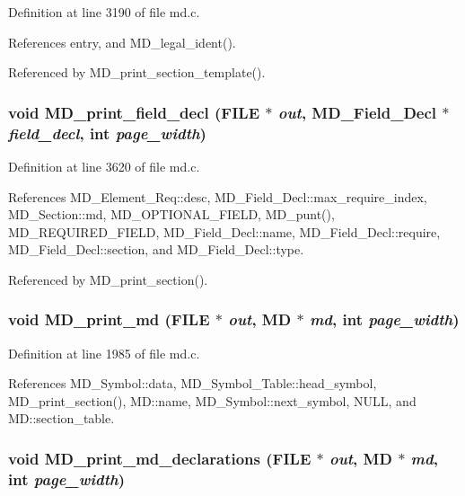 Definition at line 3190 of file md.c.

References entry, and MD\_\-legal\_\-ident().

Referenced by MD\_\-print\_\-section\_\-template().
\subsubsection{\setlength{\rightskip}{0pt plus 5cm}void MD\_\-print\_\-field\_\-decl (FILE $\ast$ {\em out}, \bf{MD\_\-Field\_\-Decl} $\ast$ {\em field\_\-decl}, int {\em page\_\-width})}\label{md_8h_da54c72928268acad4526ab846aa837d}




Definition at line 3620 of file md.c.

References MD\_\-Element\_\-Req::desc, MD\_\-Field\_\-Decl::max\_\-require\_\-index, MD\_\-Section::md, MD\_\-OPTIONAL\_\-FIELD, MD\_\-punt(), MD\_\-REQUIRED\_\-FIELD, MD\_\-Field\_\-Decl::name, MD\_\-Field\_\-Decl::require, MD\_\-Field\_\-Decl::section, and MD\_\-Field\_\-Decl::type.

Referenced by MD\_\-print\_\-section().
\subsubsection{\setlength{\rightskip}{0pt plus 5cm}void MD\_\-print\_\-md (FILE $\ast$ {\em out}, \bf{MD} $\ast$ {\em md}, int {\em page\_\-width})}\label{md_8h_a9df1e553926805d90c54daf8439c069}




Definition at line 1985 of file md.c.

References MD\_\-Symbol::data, MD\_\-Symbol\_\-Table::head\_\-symbol, MD\_\-print\_\-section(), MD::name, MD\_\-Symbol::next\_\-symbol, NULL, and MD::section\_\-table.
\subsubsection{\setlength{\rightskip}{0pt plus 5cm}void MD\_\-print\_\-md\_\-declarations (FILE $\ast$ {\em out}, \bf{MD} $\ast$ {\em md}, int {\em page\_\-width})}\label{md_8h_f8bca4aa4b831162fb2d76ba4a86d6aa}




